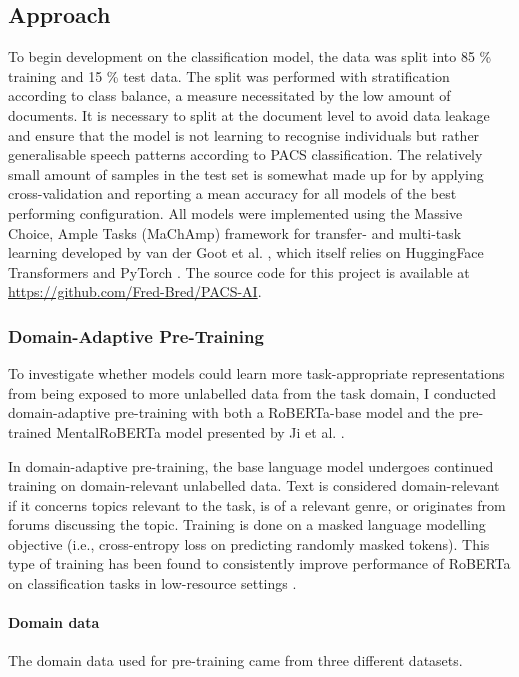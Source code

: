 \documentclass[12pt]{report}
\begin{document}
\subsection{Approach}
To begin development on the classification model, the data was split into 85 \% training and 15 \% test data.
The split was performed with stratification according to class balance, a measure necessitated by the low amount of documents.
It is necessary to split at the document level to avoid data leakage and ensure that the model is not learning to recognise individuals but rather generalisable speech patterns according to PACS classification.
The relatively small amount of samples in the test set is somewhat made up for by applying cross-validation and reporting a mean accuracy for all models of the best performing configuration.
All models were implemented using the Massive Choice, Ample Tasks (MaChAmp) framework for transfer- and multi-task learning developed by van der Goot et al. \citeyear{MaChAmp}, which itself relies on HuggingFace Transformers \cite{HuggingFace} and PyTorch \cite{PyTorch}.
The source code for this project is available at \url{https://github.com/Fred-Bred/PACS-AI}.

\subsubsection{Domain-Adaptive Pre-Training}
To investigate whether models could learn more task-appropriate representations from being exposed to more unlabelled data from the task domain, I conducted domain-adaptive pre-training with both a RoBERTa-base model \cite{roberta} and the pre-trained MentalRoBERTa model presented by Ji et al. \citeyear{MentalBERT}.

In domain-adaptive pre-training, the base language model undergoes continued training on domain-relevant unlabelled data.
Text is considered domain-relevant if it concerns topics relevant to the task, is of a relevant genre, or originates from forums discussing the topic.
Training is done on a masked language modelling objective (i.e., cross-entropy loss on predicting randomly masked tokens).
This type of training has been found to consistently improve performance of RoBERTa on classification tasks in low-resource settings \cite{Gururangan2020}.

\paragraph*{Domain data}
The domain data used for pre-training came from three different datasets.
\end{document}
